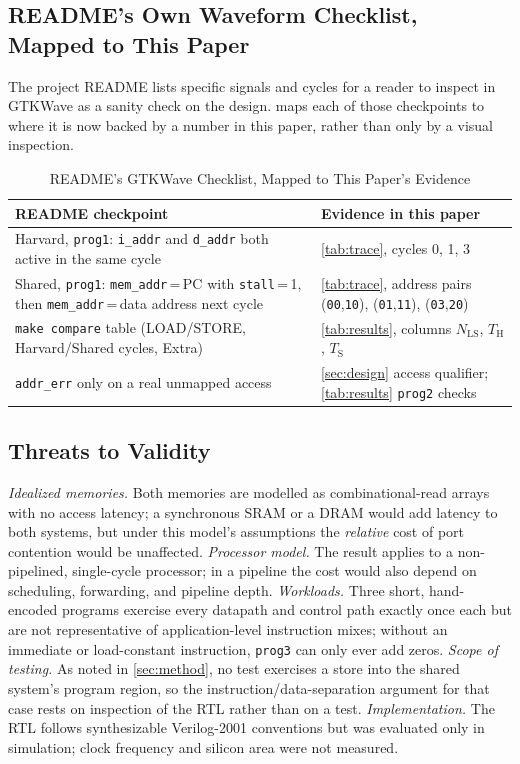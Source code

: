 \documentclass[conference]{IEEEtran}
\newcommand{\NLS}{N_{\mathrm{LS}}}
\newcommand{\Tharv}{T_{\mathrm{H}}}
\newcommand{\Tshr}{T_{\mathrm{S}}}
\begin{document}
\subsection{README's Own Waveform Checklist, Mapped to This Paper}
The project README lists specific signals and cycles for a reader to inspect in GTKWave as a
sanity check on the design.  maps each of those checkpoints to where it is now
backed by a number in this paper, rather than only by a visual inspection.

\begin{table}[t]
\centering
\caption{README's GTKWave Checklist, Mapped to This Paper's Evidence}
\label{tab:objectives}
\footnotesize
\begin{tabularx}{\columnwidth}{@{}>{\raggedright\arraybackslash}p{} X@{}}
\toprule
README checkpoint & Evidence in this paper \\
\midrule
Harvard, \texttt{prog1}: \texttt{i\_addr} and \texttt{d\_addr} both active in the same cycle & \cref{tab:trace}, cycles 0, 1, 3 \\
Shared, \texttt{prog1}: \texttt{mem\_addr}\,=\,PC with \texttt{stall}\,=\,1, then \texttt{mem\_addr}\,=\,data address next cycle & \cref{tab:trace}, address pairs (\texttt{00},\texttt{10}), (\texttt{01},\texttt{11}), (\texttt{03},\texttt{20}) \\
\texttt{make compare} table (LOAD/STORE, Harvard/Shared cycles, Extra) & \cref{tab:results}, columns $\NLS$, $\Tharv$, $\Tshr$ \\
\texttt{addr\_err} only on a real unmapped access & \cref{sec:design} access qualifier; \cref{tab:results} \texttt{prog2} checks \\
\bottomrule
\end{tabularx}
\end{table}

\subsection{Threats to Validity}
\textit{Idealized memories.} Both memories are modelled as combinational-read arrays with no access
latency; a synchronous SRAM or a DRAM would add latency to both systems, but under this model's
assumptions the \emph{relative} cost of port contention would be unaffected. \textit{Processor
model.} The result applies to a non-pipelined, single-cycle processor; in a pipeline the cost would
also depend on scheduling, forwarding, and pipeline depth. \textit{Workloads.} Three short,
hand-encoded programs exercise every datapath and control path exactly once each but are not
representative of application-level instruction mixes; without an immediate or load-constant
instruction, \texttt{prog3} can only ever add zeros. \textit{Scope of testing.} As noted in
\cref{sec:method}, no test exercises a store into the shared system's program region, so the
instruction/data-separation argument for that case rests on inspection of the RTL rather than on a
test. \textit{Implementation.} The RTL follows synthesizable Verilog-2001 conventions but was
evaluated only in simulation; clock frequency and silicon area were not measured.
\end{document}
